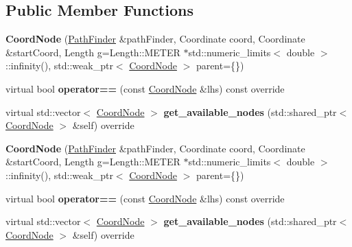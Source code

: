 \subsection*{Public Member Functions}
\begin{DoxyCompactItemize}
\item 
{\bfseries Coord\+Node} (\hyperlink{class_path_finder}{Path\+Finder} \&path\+Finder, Coordinate coord, Coordinate \&start\+Coord, Length g=Length\+::\+M\+E\+T\+ER $\ast$std\+::numeric\+\_\+limits$<$ double $>$\+::infinity(), std\+::weak\+\_\+ptr$<$ \hyperlink{class_path_finder_1_1_coord_node}{Coord\+Node} $>$ parent=\{\})\hypertarget{class_path_finder_1_1_coord_node_addb07756c6084973916005856b7fb5ff}{}\label{class_path_finder_1_1_coord_node_addb07756c6084973916005856b7fb5ff}

\item 
virtual bool {\bfseries operator==} (const \hyperlink{class_path_finder_1_1_coord_node}{Coord\+Node} \&lhs) const  override\hypertarget{class_path_finder_1_1_coord_node_a9759ffc6e0601d6f7020046bdd999e39}{}\label{class_path_finder_1_1_coord_node_a9759ffc6e0601d6f7020046bdd999e39}

\item 
virtual std\+::vector$<$ \hyperlink{class_path_finder_1_1_coord_node}{Coord\+Node} $>$ {\bfseries get\+\_\+available\+\_\+nodes} (std\+::shared\+\_\+ptr$<$ \hyperlink{class_path_finder_1_1_coord_node}{Coord\+Node} $>$ \&self) override\hypertarget{class_path_finder_1_1_coord_node_a4d454f321e93b41ff8746af411bfc6d6}{}\label{class_path_finder_1_1_coord_node_a4d454f321e93b41ff8746af411bfc6d6}

\item 
{\bfseries Coord\+Node} (\hyperlink{class_path_finder}{Path\+Finder} \&path\+Finder, Coordinate coord, Coordinate \&start\+Coord, Length g=Length\+::\+M\+E\+T\+ER $\ast$std\+::numeric\+\_\+limits$<$ double $>$\+::infinity(), std\+::weak\+\_\+ptr$<$ \hyperlink{class_path_finder_1_1_coord_node}{Coord\+Node} $>$ parent=\{\})\hypertarget{class_path_finder_1_1_coord_node_addb07756c6084973916005856b7fb5ff}{}\label{class_path_finder_1_1_coord_node_addb07756c6084973916005856b7fb5ff}

\item 
virtual bool {\bfseries operator==} (const \hyperlink{class_path_finder_1_1_coord_node}{Coord\+Node} \&lhs) const  override\hypertarget{class_path_finder_1_1_coord_node_a4c72c79b89ada34c9203632add9adbcb}{}\label{class_path_finder_1_1_coord_node_a4c72c79b89ada34c9203632add9adbcb}

\item 
virtual std\+::vector$<$ \hyperlink{class_path_finder_1_1_coord_node}{Coord\+Node} $>$ {\bfseries get\+\_\+available\+\_\+nodes} (std\+::shared\+\_\+ptr$<$ \hyperlink{class_path_finder_1_1_coord_node}{Coord\+Node} $>$ \&self) override\hypertarget{class_path_finder_1_1_coord_node_a4d454f321e93b41ff8746af411bfc6d6}{}\label{class_path_finder_1_1_coord_node_a4d454f321e93b41ff8746af411bfc6d6}

\end{DoxyCompactItemize}
